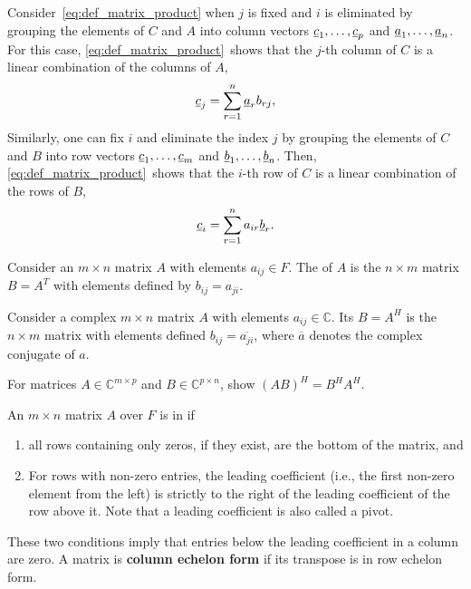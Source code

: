 \begin{remark}
Consider~\eqref{eq:def_matrix_product} when $j$ is fixed and $i$ is eliminated by grouping the elements of $C$ and $A$ into column vectors $\underline{c}_1,\ldots,\underline{c}_{p}$ and $\underline{a}_1,\ldots,\underline{a}_n$. For this case, \eqref{eq:def_matrix_product}~shows that the $j$-th column of $C$ is a linear combination of the columns of $A$,
\[ \underline{c}_{j} = \sum_{r = 1}^n \underline{a}_r b_{rj}, \]
Similarly, one can fix $i$ and eliminate the index $j$ by grouping the elements of $C$ and $B$ into row vectors  $\underline{c}_1,\ldots,\underline{c}_{m}$ and $\underline{b}_1,\ldots,\underline{b}_n$.
Then, \eqref{eq:def_matrix_product}~shows that the $i$-th row of $C$ is a linear combination of the rows of $B$,
\[ \underline{c}_{i} = \sum_{r = 1}^n a_{ir} \underline{b}_r. \]
\end{remark}

\begin{definition}
Consider an $m \times n$ matrix $A$ with elements $a_{ij} \in F$.
The  of $A$ is the $n \times m$ matrix $B = A^T$ with elements defined by $b_{ij} = a_{ji}$.
\end{definition}

\begin{definition}
Consider a complex $m \times n$ matrix $A$ with elements $a_{ij} \in \mathbb{C}$.
Its  $B = A^H$ is the $n \times m$ matrix with elements defined $b_{ij} = \overline{a_{ji}}$, where $\overline{a}$ denotes the complex conjugate of $a$.
\end{definition}

\begin{problem}
For matrices $A \in \mathbb{C}^{m\times p}$ and $B \in \mathbb{C}^{p \times n}$, show $(AB)^H = B^H A^H$.
\end{problem}

\begin{definition}
An $m\times n$ matrix $A$ over $F$ is in  if
\begin{enumerate}
\item all rows containing only zeros, if they exist, are the bottom of the matrix, and
\item For rows with non-zero entries, the leading coefficient (i.e., the first non-zero element from the left) is strictly to the right of the leading coefficient of the row above it. Note that a leading coefficient is also called a pivot.
\end{enumerate}
These two conditions imply that entries below the leading coefficient in a column are zero.
A matrix is \textbf{column echelon form} if its transpose is in row echelon form.
\end{definition}

